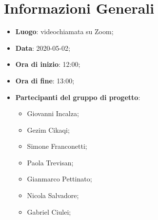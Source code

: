 \section{Informazioni Generali}
	\begin{itemize}
		\item \textbf {Luogo}: videochiamata su Zoom;
		\item \textbf {Data}: 2020-05-02;
		\item \textbf {Ora di inizio}: 12:00;
		\item \textbf {Ora di fine}: 13:00;
		\item \textbf {Partecipanti del gruppo di progetto}:
			\begin{itemize}
				\item Giovanni Incalza;
				\item Gezim Cikaqi;
				\item Simone Franconetti;
				\item Paola Trevisan;
				\item Gianmarco Pettinato;
				\item Nicola Salvadore;
				\item Gabriel Ciulei;
			\end{itemize}
	\end{itemize}